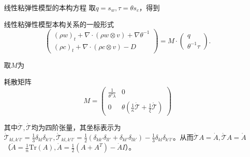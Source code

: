 \documentclass[mathserif]{beamer}
\begin{document}
	\begin{frame}{线性粘弹性模型的本构方程}
	\pause
	 取$q =s_w,\tau = \theta s_c$，得到%
	 \pause
	\begin{block}{线性粘弹性模型本构关系的一般形式}
	\begin{equation*} \label{eq:CDFgeneral  }
		\left( \begin{array}{c} 
			(\rho w)_t +  \nabla \cdot (\rho w \otimes v)  + \nabla \theta^{-1} \\
			(\rho c)_t +  \nabla \cdot (\rho c \otimes v)  - D
		\end{array} \right) = M \cdot
		\left( \begin{array}{c} 
			q \\ \theta^{-1} \tau
		\end{array}\right).
	\end{equation*}
	\end{block}
	\pause
	取$M$为
	\begin{block}{耗散矩阵}
			\begin{equation*}
		M = \left( \begin{array}{ccc} 
			\frac{1}{\theta^2 \lambda} & 0 \\
			0 &  \theta(\frac{1}{\kappa} \dot{\mathcal{T}} + \frac{1}{\xi} \mathring{\mathcal{T}})  
		\end{array} \right)
	\end{equation*}
	\end{block}
	
	其中$\dot{\mathcal{T}}, \mathring{\mathcal{T}}$均为四阶张量，其坐标表示为$\dot{\mathcal{T}}_{kl,k'l'} = \frac{1}{3}\delta_{kl} \delta_{k'l'}, \mathring{\mathcal{T}}_{kl,k'l'} =\frac{1}{2}(\delta_{kk'}\delta_{ll'} + \delta_{kl'} \delta_{lk'} ) -\frac{1}{3}\delta_{kl} \delta_{k'l'} $。从而$\dot{\mathcal{T}} A = \dot{A},\mathring{\mathcal{T}} A = \mathring{A}$（$\dot{A} = \frac{1}{n} \mbox{Tr}(A),\mathring{A} = \frac{1}{2} (A+A^T) - \dot{A} I$）。

\end{frame}
\end{document}

